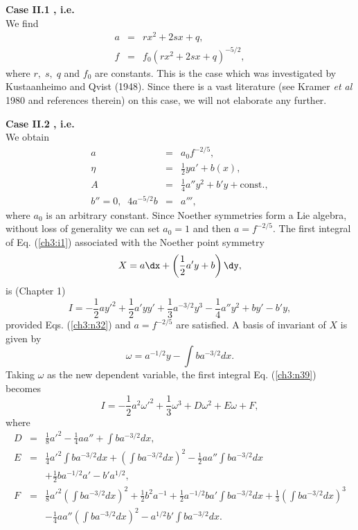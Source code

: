 {\bf Case II.1 , i.e.  }\\
We  find \begin{eqnarray} a &=& rx^2+2sx+q, \label{ch3:n27} \\ f &=&
f_0(rx^2+2sx+q)^{-5/2}, \label{ch3:n28} \end{eqnarray} where $r,\;s,\;q$ and
$f_0$ are constants. This is the case which was investigated by Kustaanheimo
and Qvist (1948). Since there is a vast literature
(see Kramer {\em et al} 1980 and
references therein) on this case, we will not elaborate any further.

{\bf Case II.2  , i.e.
}\\ We  obtain \begin{eqnarray} a &=& a_0f^{-2/5},
\label{ch3:n29}\\ \eta &=& \frac{1}{2}ya'+b(x),\label{ch3:n30}\\ A &=&
\frac{1}{4}a''y^2+b'y+\mbox{const.}, \label{ch3:n31}\\
b''=0,\;\;4a^{-5/2}b &= & a''', \label{ch3:n32} \end{eqnarray} where
$a_0$ is an arbitrary constant. Since Noether symmetries form a Lie
algebra, without loss of generality we can set $a_0=1$ and then 
$a=f^{-2/5}$.
The  first integral of Eq. (\ref{ch3:i1}) associated with
the Noether point symmetry \begin{equation} X= a\dx+\left
(\frac{1}{2}a'y+b\right )\dy, \label{ch3:n38} \end{equation} is (Chapter 1)
\begin{equation}
I=-\frac{1}{2}ay'^2+\frac{1}{2}a'yy'+\frac{1}{3}a^{-3/2}y^3-\frac{1}{4}a''y^2 
+by'-b'y, \label{ch3:n39} \end{equation} provided Eqs.
(\ref{ch3:n32}) and $a=f^{-2/5}$ are satisfied. A basis of invariant of $X$ is
given by \begin{equation} \omega=a^{-1/2}y-\int ba^{-3/2}dx . \label{ch3:n40}
\end{equation} Taking $\omega$ as the new dependent variable, the first
integral Eq. (\ref{ch3:n39}) becomes
\begin{equation}
I=-\frac{1}{2}a^2\omega'^2+\frac{1}{3}\omega^3+D\omega^2+E\omega+F,
\label{ch3:n41}
\end{equation}
where
\begin{eqnarray}
D &=& \frac{1}{8}a'^2-\frac{1}{4}aa''+\int ba^{-3/2}dx, \label{ch3:n42} \\ E
&=& \frac{1}{4}a'^2\int ba^{-3/2}dx+\left (\int ba^{-3/2}dx\right )^2
-\frac{1}{2}aa''\int ba^{-3/2}dx \nonumber\\
 & & +\frac{1}{2}ba^{-1/2}a'-b'a^{1/2},
\label{ch3:n43}\\
F &=& \frac{1}{8}a'^2\left (\int ba^{-3/2}dx\right )^2
+\frac{1}{2}b^2a^{-1} +\frac{1}{2}a^{-1/2}ba'\int
ba^{-3/2}dx+\frac{1}{3}\left ( \int b a^{-3/2} dx \right )^3 \nonumber \\
& & -\frac{1}{4}aa''\left (\int ba^{-3/2}dx \right )^2-a^{1/2}b'\int
ba^{-3/2}dx. \label{ch3:n44} \end{eqnarray} 

